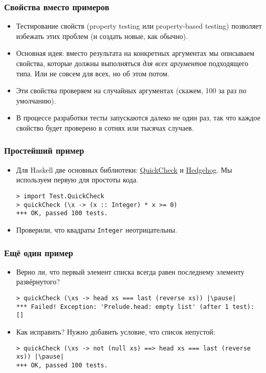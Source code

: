 \documentclass[11pt]{beamer}
\begin{document}
\begin{frame}[fragile]
  \frametitle{Свойства вместо примеров}
  \begin{itemize}
    \item Тестирование свойств (property testing или property-based testing) позволяет избежать этих проблем (и создать новые, как обычно).
    \item Основная идея: вместо результата на конкретных аргументах мы описываем свойства, которые должны выполняться \emph{для всех аргументов} подходящего типа. \pause Или не совсем для всех, но об этом потом.
          \pause
    \item Эти свойства проверяем на случайных аргументах (скажем, 100 за раз по умолчанию).
          \pause
    \item В процессе разработки тесты запускаются далеко не один раз, так что каждое свойство будет проверено в сотнях или тысячах случаев.
  \end{itemize}
\end{frame}


\begin{frame}[fragile]
  \frametitle{Простейший пример}
  \begin{itemize}
    \item Для Haskell две основных библиотеки: \href{http://hackage.haskell.org/package/QuickCheck}{QuickCheck} и \href{https://github.com/hedgehogqa/haskell-hedgehog/}{Hedgehog}. Мы используем первую для простоты кода.
          \begin{lstlisting}[basicstyle=\ttfamily\small]
> import Test.QuickCheck
> quickCheck (\x -> (x :: Integer) * x >= 0)
+++ OK, passed 100 tests.
\end{lstlisting}
    \item Проверили, что квадраты \lstinline|Integer| неотрицательны.
  \end{itemize}
\end{frame}

\begin{frame}[fragile]
  \frametitle{Ещё один пример}
  \begin{itemize}
    \item Верно ли, что первый элемент списка всегда равен последнему элементу развёрнутого?
          \begin{lstlisting}[escapeinside=||,basicstyle=\ttfamily\small]
> quickCheck (\xs -> head xs === last (reverse xs)) |\pause|
*** Failed! Exception: 'Prelude.head: empty list' (after 1 test):
[]
\end{lstlisting}
    \item Как исправить? \pause Нужно добавить условие, что список непустой:
          \begin{lstlisting}[escapeinside=||,basicstyle=\ttfamily\small]
> quickCheck (\xs -> not (null xs) ==> head xs === last (reverse xs)) |\pause|
+++ OK, passed 100 tests.
\end{lstlisting}

  \end{itemize}
\end{frame}
\end{document}
